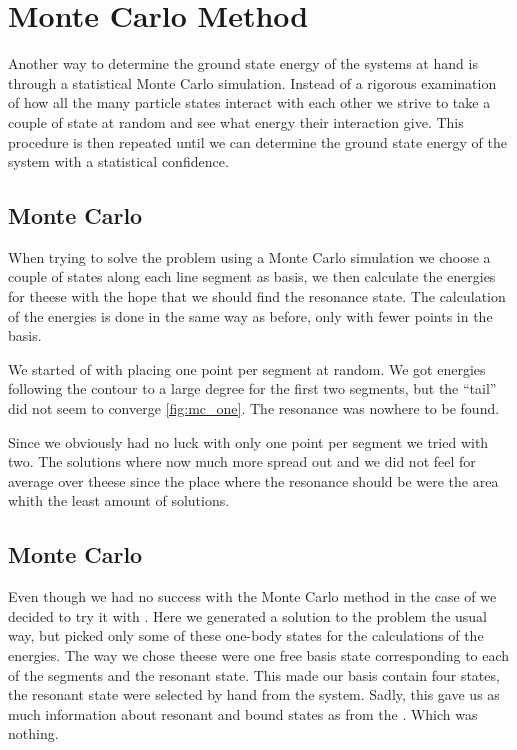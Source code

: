 \documentclass[../main/report.tex]{subfiles}
\begin{document}
\chapter{Monte Carlo Method}
\label{cha:monte_carlo}

Another way to determine the ground state energy of the systems at hand is through a statistical Monte Carlo simulation. 
Instead of a rigorous examination of how all the many particle states interact with each other we strive to take a couple of state at random and see what energy their interaction give. 
This procedure is then repeated until we can determine the ground state energy of the system with a statistical confidence.

\section{Monte Carlo }
When trying to solve the  problem using a Monte Carlo simulation we choose a couple of states along each line segment as basis, we then calculate the energies for theese with the hope that we should find the resonance state.
The calculation of the energies is done in the same way as before, only with fewer points in the basis.

We started of with placing one point per segment at random.
We got energies following the contour to a large degree for the first two segments, but the ``tail'' did not seem to converge \cref{fig:mc_one}.
The resonance was nowhere to be found.

Since we obviously had no luck with only one point per segment we tried with two.
The solutions where now much more spread out and we did not feel for average over theese since the place where the resonance should be were the area whith the least amount of solutions.

\section{Monte Carlo }
Even though we had no success with the Monte Carlo method in the case of  we decided to try it with .
Here we generated a solution to the  problem the usual way, but picked only some of these one-body states for the calculations of the energies.
The way we chose theese were one free basis state corresponding to each of the segments and the resonant state.
This made our basis contain four states, the resonant state were selected by hand from the  system.
Sadly, this gave us as much information about resonant and bound states as from the .
Which was nothing.
\end{document}
